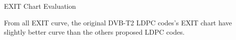 \documentclass[11pt, aspectratio=169]{beamer}
\begin{document}
\begin{frame}{EXIT Chart Evaluation}
\vspace{0.5cm}

From all EXIT curve, the original DVB-T2 LDPC codes's EXIT chart have slightly better curve than the others proposed LDPC codes.
	
\end{frame}

%			
\end{document}
